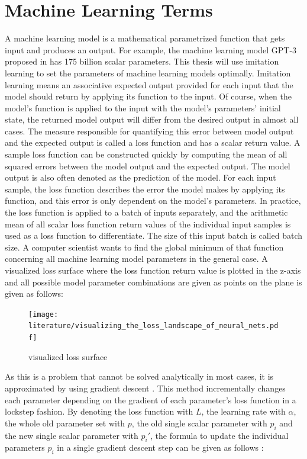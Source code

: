 \documentclass[draft,final]{vutinfth} %
\begin{document}
\section{Machine Learning Terms}
A machine learning model is a mathematical parametrized function that gets input and produces an output.
For example, the machine learning model GPT-3 proposed in \cite{GPT-3} has 175 billion scalar parameters.
This thesis will use imitation learning to set the parameters of machine learning models optimally.
Imitation learning means an associative expected output provided for each input that the model should return by applying its function to the input.
Of course, when the model's function is applied to the input with the model's parameters' initial state, the returned model output will differ from the desired output in almost all cases.
The measure responsible for quantifying this error between model output and the expected output is called a loss function and has a scalar return value.
A sample loss function can be constructed quickly by computing the mean of all squared errors between the model output and the expected output.
The model output is also often denoted as the prediction of the model.
For each input sample, the loss function describes the error the model makes by applying its function, and this error is only dependent on the model's parameters.
In practice, the loss function is applied to a batch of inputs separately, and the arithmetic mean of all scalar loss function return values of the individual input samples is used as a loss function to differentiate.
The size of this input batch is called batch size.
A computer scientist wants to find the global minimum of that function concerning all machine learning model parameters in the general case.
A visualized loss surface where the loss function return value is plotted in the z-axis and all possible model parameter combinations are given as points on the plane is given as follows:
\begin{figure}[H]
\centering{}
\texttt{[image: literature/visualizing\_the\_loss\_landscape\_of\_neural\_nets.pdf]}
\caption{visualized loss surface \cite[p. 1]{loss_vis}}
\label{fig:loss_vis}
\end{figure}
As this is a problem that cannot be solved analytically in most cases, it is approximated by using gradient descent \cite{GradientDescent}.
This method incrementally changes each parameter depending on the gradient of each parameter's loss function in a lockstep fashion.
By denoting the loss function with $L$, the learning rate with $\alpha$, the whole old parameter set with $p$, the old single scalar parameter with $p_i$ and the new single scalar parameter with $p_i'$, the formula to update the individual parameters $p_i$ in a single gradient descent step can be given as follows \cite{GradientDescent}:
\end{document}
